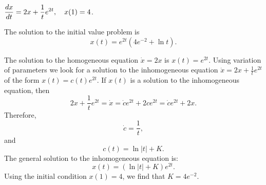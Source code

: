 \documentclass{ximera}
\begin{document}
\begin{exercise}   \label{c14.2.6d}
$\displaystyle \frac{dx}{dt} = 2x+\frac{1}{t}e^{2t}, \quad x(1)=4$.

\begin{solution}
\ans The solution to the initial value problem is
\[
x(t) = e^{2t}(4e^{-2}+\ln t).
\]

\soln The solution to the homogeneous equation $\dot{x}=2x$ is $x(t)=e^{2t}$.
 Using variation of parameters we look for a solution to the inhomogeneous
equation $\dot{x}=2x+\frac{1}{t}e^{2t}$ of the form $x(t)=c(t)e^{2t}$.  If
$x(t)$ is a solution to the inhomogeneous equation, then
\[
2x+\frac{1}{t}e^{2t} =\dot{x}=\dot{c}e^{2t}+2ce^{2t} = \dot{c}e^{2t}+2x.
\]
Therefore, 
\[
\dot{c} = \frac{1}{t},
\]
and 
\[
c(t) = \ln|t| + K.
\]
The general solution to the inhomogeneous equation is:
\[
x(t) = (\ln|t| + K)e^{2t}.
\]
Using the initial condition $x(1)=4$, we find that $K=4e^{-2}$.



\end{solution}
\end{exercise}
\end{document}

